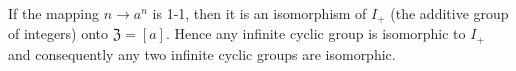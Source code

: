 If the mapping $n \to a^n$ is 1-1, then it is an isomorphism of $I_+$ (the additive group of integers) onto $\mathfrak{Z} = [a]$. Hence any infinite cyclic group is isomorphic to $I_+$ and consequently any two infinite cyclic groups are isomorphic.
